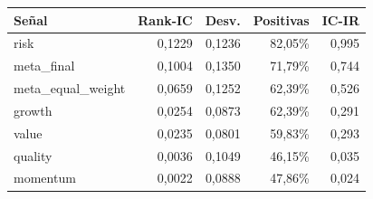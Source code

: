 \begin{tabular}{lrrrr}
\toprule
Señal & Rank-IC & Desv. & Positivas & IC-IR \\
\midrule
risk & 0,1229 & 0,1236 & 82,05\% & 0,995 \\
meta\_final & 0,1004 & 0,1350 & 71,79\% & 0,744 \\
meta\_equal\_weight & 0,0659 & 0,1252 & 62,39\% & 0,526 \\
growth & 0,0254 & 0,0873 & 62,39\% & 0,291 \\
value & 0,0235 & 0,0801 & 59,83\% & 0,293 \\
quality & 0,0036 & 0,1049 & 46,15\% & 0,035 \\
momentum & 0,0022 & 0,0888 & 47,86\% & 0,024 \\
\bottomrule
\end{tabular}
